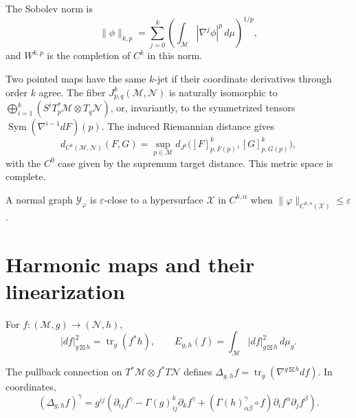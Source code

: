 \begin{definition}
\label{def:chow-iv-k8-sobolev-spaces}
The Sobolev norm is
\[
\|\phi\|_{k,p}=\sum_{j=0}^k\left(\int_{\mathcal M}|\nabla^j\phi|^p\,d\mu\right)^{1/p},
\]
and $W^{k,p}$ is the completion of $C^k$ in this norm.
\end{definition}

Two pointed maps have the same $k$-jet if their coordinate derivatives through
order $k$ agree.  The fiber $J^k_{p,q}(\mathcal M,\mathcal N)$ is naturally
isomorphic to $\bigoplus_{i=1}^k(S^iT_p^*\mathcal M\otimes T_q\mathcal N)$,
or, invariantly, to the symmetrized tensors
$\operatorname{Sym}(\nabla^{i-1}dF)(p)$.  The induced Riemannian distance gives
\[
d_{C^k(\mathcal M,\mathcal N)}(F,G)=
\sup_{p\in\mathcal M}d_{J^k}\bigl([F]^k_{p,F(p)},[G]^k_{p,G(p)}\bigr),
\]
with the $C^0$ case given by the supremum target distance.  This metric space
is complete.

\begin{definition}
\label{def:chow-iv-k9-hypersurface-closeness}
A normal graph $\mathcal Y_\varphi$ is $\varepsilon$-close to a hypersurface
$\mathcal X$ in $C^{k,\alpha}$ when
$\|\varphi\|_{C^{k,\alpha}(\mathcal X)}\le\varepsilon$.
\end{definition}

\section{Harmonic maps and their linearization}

\begin{definition}
\label{def:chow-iv-k10-map-energy}
For $f:(\mathcal M,g)\to(\mathcal N,h)$,
\[
|df|^2_{g\boxtimes h}=\operatorname{tr}_g(f^*h),\qquad
E_{g,h}(f)=\int_{\mathcal M}|df|^2_{g\boxtimes h}\,d\mu_g.
\]
\end{definition}

\begin{lemma}
\label{lem:chow-iv-k11-map-laplacian-coordinates}
The pullback connection on $T^*\mathcal M\otimes f^*T\mathcal N$ defines
$\Delta_{g,h}f=\operatorname{tr}_g(\nabla^{g\boxtimes h}df)$.  In coordinates,
\[
(\Delta_{g,h}f)^\gamma=g^{ij}\left(\partial_{ij}f^\gamma-
\Gamma(g)^k_{ij}\partial_kf^\gamma+
(\Gamma(h)^\gamma_{\alpha\beta}\circ f)\partial_if^\alpha\partial_jf^\beta\right).
\]
\end{lemma}

